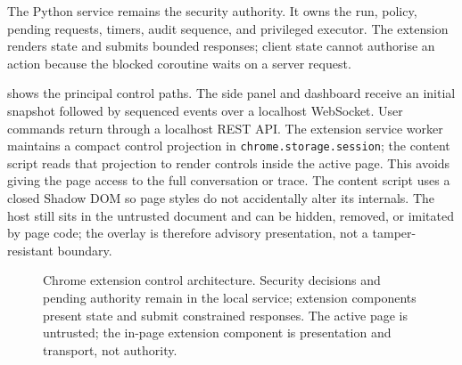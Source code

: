 The Python service remains the security authority. It owns the run, policy,
pending requests, timers, audit sequence, and privileged executor. The
extension renders state and submits bounded responses; client state cannot
authorise an action because the blocked coroutine waits on a server request.

 shows the principal control paths. The side
panel and dashboard receive an initial snapshot followed by sequenced events
over a localhost WebSocket. User commands return through a localhost REST API.
The extension service worker maintains a compact control projection in
\texttt{chrome.storage.session}; the content script reads that projection to
render controls inside the active page. This avoids giving the page access to
the full conversation or trace. The content script uses a closed Shadow DOM so
page styles do not accidentally alter its internals. The host still sits in the
untrusted document and can be hidden, removed, or imitated by page code; the
overlay is therefore advisory presentation, not a tamper-resistant boundary.

\begin{figure}[htbp]
\centering
{}
\caption{Chrome extension control architecture. Security decisions and pending
authority remain in the local service; extension components present state and
submit constrained responses. The active page is untrusted; the in-page
extension component is presentation and transport, not authority.}
\label{fig:extension-architecture}
\end{figure}

